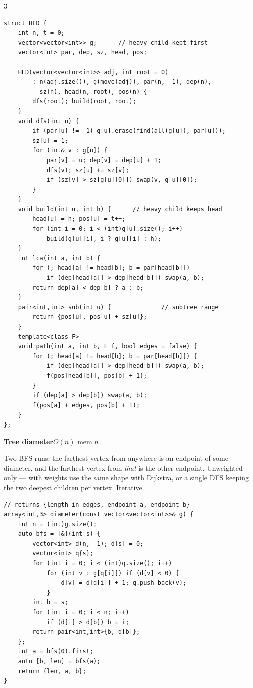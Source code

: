 \documentclass[9pt,a4paper]{extarticle}
\newcommand{\entry}[3]{%
  \addcontentsline{toc}{subsection}{#1}%
  \vspace{0.8ex}%
  \noindent\colorbox{hdbg}{\parbox{\dimexpr\columnwidth-2\fboxsep}{%
    \strut\textbf{#1}\hfill{\footnotesize\textsf{#2}}}}\par
  \vspace{0.4ex}%
  {\footnotesize #3\par}%
}
\begin{document}
\begin{multicols*}{3}
\begin{lstlisting}
struct HLD {
    int n, t = 0;
    vector<vector<int>> g;      // heavy child kept first
    vector<int> par, dep, sz, head, pos;

    HLD(vector<vector<int>> adj, int root = 0)
        : n(adj.size()), g(move(adj)), par(n, -1), dep(n),
          sz(n), head(n, root), pos(n) {
        dfs(root); build(root, root);
    }
    void dfs(int u) {
        if (par[u] != -1) g[u].erase(find(all(g[u]), par[u]));
        sz[u] = 1;
        for (int& v : g[u]) {
            par[v] = u; dep[v] = dep[u] + 1;
            dfs(v); sz[u] += sz[v];
            if (sz[v] > sz[g[u][0]]) swap(v, g[u][0]);
        }
    }
    void build(int u, int h) {      // heavy child keeps head
        head[u] = h; pos[u] = t++;
        for (int i = 0; i < (int)g[u].size(); i++)
            build(g[u][i], i ? g[u][i] : h);
    }
    int lca(int a, int b) {
        for (; head[a] != head[b]; b = par[head[b]])
            if (dep[head[a]] > dep[head[b]]) swap(a, b);
        return dep[a] < dep[b] ? a : b;
    }
    pair<int,int> sub(int u) {              // subtree range
        return {pos[u], pos[u] + sz[u]};
    }
    template<class F>
    void path(int a, int b, F f, bool edges = false) {
        for (; head[a] != head[b]; b = par[head[b]]) {
            if (dep[head[a]] > dep[head[b]]) swap(a, b);
            f(pos[head[b]], pos[b] + 1);
        }
        if (dep[a] > dep[b]) swap(a, b);
        f(pos[a] + edges, pos[b] + 1);
    }
};
\end{lstlisting}

\entry{Tree diameter}{$O(n)$ \quad mem $n$}{%
Two BFS runs: the farthest vertex from anywhere is an endpoint of some diameter, and
the farthest vertex from \emph{that} is the other endpoint. Unweighted only --- with
weights use the same shape with Dijkstra, or a single DFS keeping the two deepest
children per vertex. Iterative.}

\begin{lstlisting}
// returns {length in edges, endpoint a, endpoint b}
array<int,3> diameter(const vector<vector<int>>& g) {
    int n = (int)g.size();
    auto bfs = [&](int s) {
        vector<int> d(n, -1); d[s] = 0;
        vector<int> q{s};
        for (int i = 0; i < (int)q.size(); i++)
            for (int v : g[q[i]]) if (d[v] < 0) {
                d[v] = d[q[i]] + 1; q.push_back(v);
            }
        int b = s;
        for (int i = 0; i < n; i++)
            if (d[i] > d[b]) b = i;
        return pair<int,int>{b, d[b]};
    };
    int a = bfs(0).first;
    auto [b, len] = bfs(a);
    return {len, a, b};
}
\end{lstlisting}


\end{multicols*}
\end{document}
